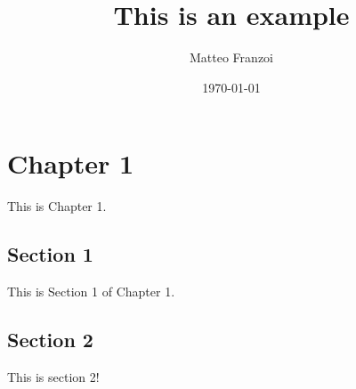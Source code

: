 \documentclass{book}
\author{Matteo Franzoi}
\date{\today}
\title{This is an example}
\begin{document}
\maketitle
\chapter{Chapter 1}
This is Chapter 1.
\section{Section 1}
This is Section 1 of Chapter 1.
\section{Section 2}
This is section 2!
\end{document}
